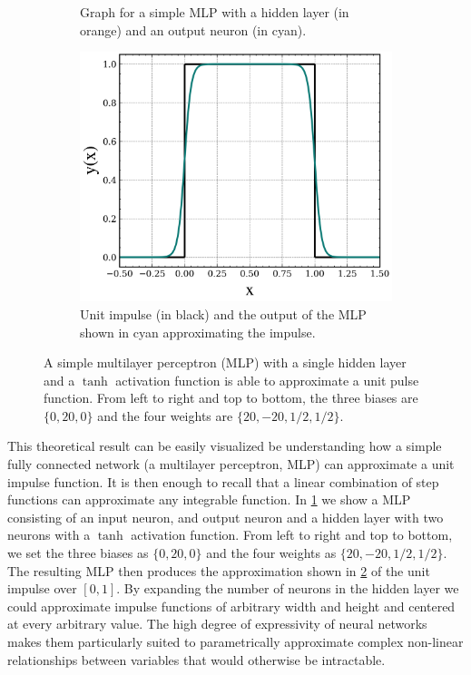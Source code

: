 \begin{figure}
\begin{subfigure}[b]{0.45\textwidth}
\begin{tikzpicture}[scale=0.2]
                    \end{tikzpicture}
        \caption{Graph for a simple MLP with a hidden layer (in orange) and an output neuron (in cyan).}
        \label{fig:MLP}
    \end{subfigure}
    \hfill
    \begin{subfigure}[b]{0.45\textwidth}
        \centering
        \includegraphics[width=1\textwidth]{img/ML/MLP_unit_impulse.png}
        \caption{Unit impulse (in black) and the output of the MLP shown in cyan approximating the impulse. }
        \label{fig:MLP_approx}
    \end{subfigure}
        \caption{A simple multilayer perceptron (MLP) with a single hidden layer and a $\tanh{}$ activation function is able to approximate a unit pulse function. From left to right and top to bottom, the three biases are $\{0, 20, 0\}$ and the four weights are $\{20, -20, 1/2, 1/2\}$.}
        \label{fig:ML MLP approx}
\end{figure}

This theoretical result can be easily visualized be understanding how a simple fully connected network (a multilayer perceptron, MLP) can approximate a unit impulse function. It is then enough to recall that a linear combination of step functions can approximate any integrable function. In \cref{fig:MLP} we show a MLP consisting of an input neuron, and output neuron and a hidden layer with two neurons with a $\tanh{}$ activation function.
From left to right and top to bottom, we set the three biases as $\{0, 20, 0\}$ and the four weights as $\{20, -20, 1/2, 1/2\}$. The resulting MLP then produces the approximation shown in \cref{fig:MLP_approx} of the unit impulse over $[0,1]$. By expanding the number of neurons in the hidden layer we could approximate impulse functions of arbitrary width and height and centered at every arbitrary value. The high degree of expressivity of neural networks makes them particularly suited to parametrically approximate complex non-linear relationships between variables that would otherwise be intractable.

